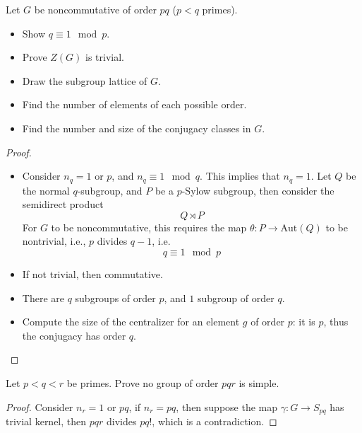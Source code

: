 \documentclass[openany]{book}
\begin{document}


\begin{prob}[2.19]
Let \( G \) be noncommutative of order \( pq \) (\( p < q \) primes).
\begin{itemize}
    \item Show \( q \equiv 1 \mod p \).
    \item Prove \( Z(G) \) is trivial.
    \item Draw the subgroup lattice of \( G \).
    \item Find the number of elements of each possible order.
    \item Find the number and size of the conjugacy classes in $G$.
\end{itemize}
\end{prob}
\begin{proof}
    \begin{itemize}
        \item Consider $n_q=1$ or $p$, and $n_q\equiv 1\mod q$. This implies that $n_q=1$. Let $Q$ be the normal $q$-subgroup, and $P$ be a $p$-Sylow subgroup, then consider the semidirect product 
        \begin{equation*}
            Q\rtimes P
        \end{equation*}
        For $G$ to be noncommutative, this requires the map $\theta: P\to\text{Aut}(Q)$ to be nontrivial, i.e., $p$ divides $q-1$, i.e.
        \begin{equation*}
            q\equiv 1\mod p
        \end{equation*}
        \item If not trivial, then commutative.
        \item There are $q$ subgroups of order $p$, and $1$ subgroup of order $q$.
        \item Compute the size of the centralizer for an element $g$ of order $p$: it is $p$, thus the conjugacy has order $q$.
    \end{itemize}
\end{proof}


\begin{prob}[2.21]
Let \( p < q < r \) be primes. Prove no group of order \( pqr \) is simple.
\end{prob}
\begin{proof}
    Consider $n_r=1$ or $pq$, if $n_r=pq$, then suppose the map $\gamma: G\to S_{pq}$ has trivial kernel, then $pqr$ divides $pq!$, which is a contradiction.
\end{proof}
\end{document}
